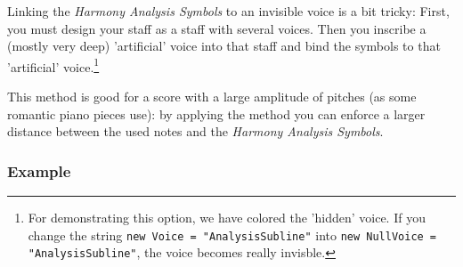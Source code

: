 \documentclass[
  DIV=calc,
  BCOR=5mm,
  12pt,
  headings=small,
  oneside,
  abstract=true,
  toc=bib,
  xcolor=dvipsnames,
  openany,
  english]{scrartcl}
\newcommand{\has}[1]{\textit{Harmony Analysis Symbol#1}}
\begin{document}
Linking the \has{s} to an invisible voice is a bit tricky: First, you must
design your staff as a staff with several voices. Then you inscribe a (mostly
very deep) 'artificial' voice into that staff and bind the symbols to that
'artificial' voice.\footnote{For demonstrating this option, we have colored the
'hidden' voice. If you change the string \texttt{new Voice = "AnalysisSubline"}
into \texttt{new NullVoice = "AnalysisSubline"}, the voice becomes really
invisble.}

This method is good for a score with a large amplitude of pitches (as some
romantic piano pieces use): by applying the method you can enforce a larger
distance between the used notes and the \has{s}.

\subsubsection{Example}
\end{document}
